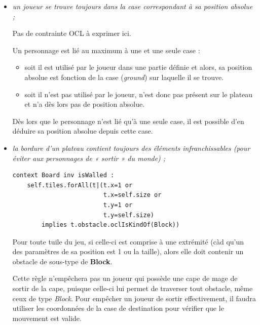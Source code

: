 \documentclass[oneside,a4paper]{book}
\begin{document}
\begin{itemize}
    \item \textit{un joueur se trouve toujours dans la case correspondant à sa position absolue ;}

    Pas de contrainte OCL à exprimer ici.
    \begin{tcolorbox}
        Un personnage est lié au maximum à une et une seule case :
        \begin{itemize}
            \item soit il est utilisé par le joueur dans une partie définie et alors, sa position absolue est fonction de la case (\textit{ground}) sur laquelle il se trouve.
            \item soit il n'est pas utilisé par le joueur, n'est donc pas présent sur le plateau et n'a dès lors pas de position absolue.
        \end{itemize}
    Dès lors que le personnage n'est lié qu'à une seule case, il est possible d'en déduire sa position absolue depuis cette case.
    \end{tcolorbox}
    
    \item \textit{la bordure d'un plateau contient toujours des éléments infranchissables (pour éviter aux personnages de « sortir » du monde) ;}
        \begin{lstlisting}
context Board inv isWalled : 
    self.tiles.forAll(t|(t.x=1 or
                         t.x=self.size or
                         t.y=1 or
                         t.y=self.size)
        implies t.obstacle.oclIsKindOf(Block))
        \end{lstlisting}
        Pour toute tuile du jeu, si celle-ci est comprise à une extrémité (càd qu'un des paramètres de sa position est 1 ou la taille), alors elle doit contenir un obstacle de sous-type de \textbf{Block}.
        
        \begin{tcolorbox}
            Cette règle n'empêchera pas un joueur qui possède une cape de mage de sortir de la cape, puisque celle-ci lui permet de traverser tout obstacle, même ceux de type \textit{Block}. \newline
            Pour empêcher un joueur de sortir effectivement, il faudra utiliser les coordonnées de la case de destination pour vérifier que le mouvement est valide.
        \end{tcolorbox}
    

\end{itemize}
\end{document}
